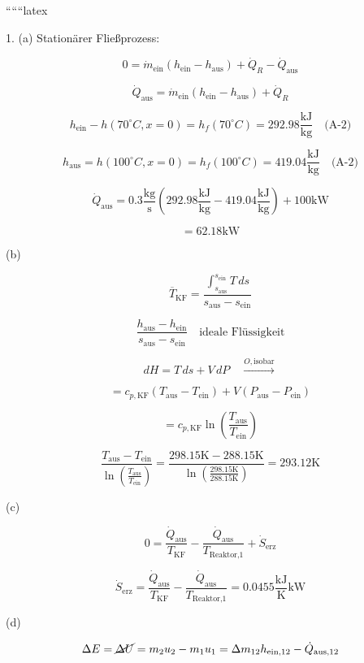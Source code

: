
``````latex


1. (a) Stationärer Fließprozess:

\[
0 = \dot{m}_{\text{ein}} (h_{\text{ein}} - h_{\text{aus}}) + \dot{Q}_R - \dot{Q}_{\text{aus}}
\]

\[
\dot{Q}_{\text{aus}} = \dot{m}_{\text{ein}} (h_{\text{ein}} - h_{\text{aus}}) + \dot{Q}_R
\]

\[
h_{\text{ein}} - h(70^\circ C, x=0) = h_f(70^\circ C) = 292.98 \frac{\text{kJ}}{\text{kg}} \quad \text{(A-2)}
\]

\[
h_{\text{aus}} = h(100^\circ C, x=0) = h_f(100^\circ C) = 419.04 \frac{\text{kJ}}{\text{kg}} \quad \text{(A-2)}
\]

\[
\dot{Q}_{\text{aus}} = 0.3 \frac{\text{kg}}{\text{s}} \left( 292.98 \frac{\text{kJ}}{\text{kg}} - 419.04 \frac{\text{kJ}}{\text{kg}} \right) + 100 \text{kW}
\]

\[
= 62.18 \text{kW}
\]

(b) 

\[
\overline{T}_{\text{KF}} = \frac{\int_{s_{\text{aus}}}^{s_{\text{ein}}} T \, ds}{s_{\text{aus}} - s_{\text{ein}}}
\]

\[
\frac{h_{\text{aus}} - h_{\text{ein}}}{s_{\text{aus}} - s_{\text{ein}}} \quad \text{ideale Flüssigkeit}
\]

\[
dH = T \, ds + V \, dP \quad \overset{O, \text{isobar}}{\rightarrow}
\]

\[
= c_{p, \text{KF}} (T_{\text{aus}} - T_{\text{ein}}) + V \left( P_{\text{aus}} - P_{\text{ein}} \right)
\]

\[
= c_{p, \text{KF}} \ln \left( \frac{T_{\text{aus}}}{T_{\text{ein}}} \right)
\]

\[
\frac{T_{\text{aus}} - T_{\text{ein}}}{\ln \left( \frac{T_{\text{aus}}}{T_{\text{ein}}} \right)} = \frac{298.15 \text{K} - 288.15 \text{K}}{\ln \left( \frac{298.15 \text{K}}{288.15 \text{K}} \right)} = 293.12 \text{K}
\]

(c) 

\[
0 = \frac{\dot{Q}_{\text{aus}}}{T_{\text{KF}}} - \frac{\dot{Q}_{\text{aus}}}{T_{\text{Reaktor,1}}} + \dot{S}_{\text{erz}}
\]

\[
\dot{S}_{\text{erz}} = \frac{\dot{Q}_{\text{aus}}}{T_{\text{KF}}} - \frac{\dot{Q}_{\text{aus}}}{T_{\text{Reaktor,1}}} = 0.0455 \frac{\text{kJ}}{\text{K}} \text{kW}
\]

(d) 

\[
\Delta E = \cancel{\Delta U} = m_2 u_2 - m_1 u_1 = \Delta m_{12} h_{\text{ein,12}} - \dot{Q}_{\text{aus,12}}
\]

